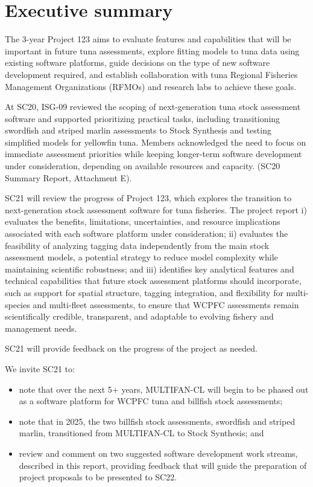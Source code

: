 \documentclass{SCreport}
\begin{document}
\wcpfctitlepage

\tableofcontents
\newpage

\section{Executive summary}

The 3-year Project 123 aims to evaluate features and capabilities that will be
important in future tuna assessments, explore fitting models to tuna data using
existing software platforms, guide decisions on the type of new software
development required, and establish collaboration with tuna Regional Fisheries
Management Organizations (RFMOs) and research labs to achieve these goals.

At SC20, ISG-09 reviewed the scoping of next-generation tuna stock assessment
software and supported prioritizing practical tasks, including transitioning
swordfish and striped marlin assessments to Stock Synthesis and testing
simplified models for yellowfin tuna. Members acknowledged the need to focus on
immediate assessment priorities while keeping longer-term software development
under consideration, depending on available resources and capacity. (SC20
Summary Report, Attachment E).

SC21 will review the progress of Project 123, which explores the transition to
next-generation stock assessment software for tuna fisheries. The project report
i) evaluates the benefits, limitations, uncertainties, and resource implications
associated with each software platform under consideration; ii) evaluates the
feasibility of analyzing tagging data independently from the main stock
assessment models, a potential strategy to reduce model complexity while
maintaining scientific robustness; and iii) identifies key analytical features
and technical capabilities that future stock assessment platforms should
incorporate, such as support for spatial structure, tagging integration, and
flexibility for multi-species and multi-fleet assessments, to ensure that WCPFC
assessments remain scientifically credible, transparent, and adaptable to
evolving fishery and management needs.

SC21 will provide feedback on the progress of the project as needed.

\vspace{4ex}

We invite SC21 to:

\begin{itemize}
  \item note that over the next 5+ years, MULTIFAN-CL will begin to be phased
  out as a software platform for WCPFC tuna and billfish stock assessments;
  \item note that in 2025, the two billfish stock assessments, swordfish and
  striped marlin, transitioned from MULTIFAN-CL to Stock Synthesis; and
  \item review and comment on two suggested software development work streams,
  described in this report, providing feedback that will guide the preparation
  of project proposals to be presented to SC22.
\end{itemize}
\end{document}
